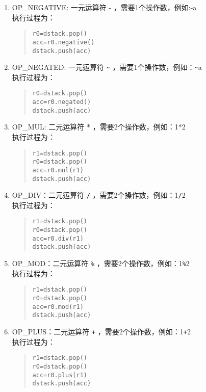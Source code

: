 \begin{enumerate}
\item OP\_NEGATIVE: 一元运算符 - ，需要1个操作数，例如:-a \\
执行过程为：
\begin{quote}
\begin{verbatim}
r0=dstack.pop()
acc=r0.negative()
dstack.push(acc)
\end{verbatim}
\end{quote}

\item OP\_NEGATED: 一元运算符 \verb|~| ，需要1个操作数，例如：\verb|~|a \\
执行过程为：
\begin{quote}
\begin{verbatim}
r0=dstack.pop()
acc=r0.negated()
dstack.push(acc)
\end{verbatim}
\end{quote}

\item OP\_MUL: 二元运算符 * ，需要2个操作数，例如：1*2 \\
执行过程为：
\begin{quote}
\begin{verbatim}
r1=dstack.pop()
r0=dstack.pop()
acc=r0.mul(r1)
dstack.push(acc)
\end{verbatim}
\end{quote}

\item OP\_DIV：二元运算符 \verb|/| ，需要2个操作数，例如：1\verb|/|2 \\
执行过程为：
\begin{quote}
\begin{verbatim}
r1=dstack.pop()
r0=dstack.pop()
acc=r0.div(r1)
dstack.push(acc)
\end{verbatim}
\end{quote}

\item OP\_MOD：二元运算符 \verb|%| ，需要2个操作数，例如：1\verb|%|2 \\
执行过程为：
\begin{quote}
\begin{verbatim}
r1=dstack.pop()
r0=dstack.pop()
acc=r0.mod(r1)
dstack.push(acc)
\end{verbatim}
\end{quote}

\item OP\_PLUS：二元运算符 \verb|+| ，需要2个操作数，例如：1\verb|+|2 \\
执行过程为：
\begin{quote}
\begin{verbatim}
r1=dstack.pop()
r0=dstack.pop()
acc=r0.plus(r1)
dstack.push(acc)
\end{verbatim}
\end{quote}


\end{enumerate}
